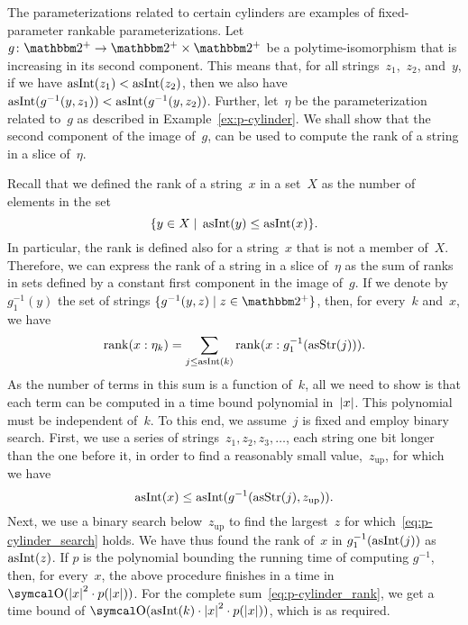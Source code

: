 \begin{example}
\label{ex:fp-rankable}%
  The parameterizations related to certain \pdash{}cylinders are examples of fixed-parameter \pdash{}rankable parameterizations.
  Let $g\colon \binary^+ \to \binary^+ \times \binary^+$ be a polytime-isomorphism that is increasing in its second component.
  This means that, for all strings~$z_1$,~$z_2$, and~$y$, if we have $\operatorname{asInt}(z_1) < \operatorname{asInt}(z_2)$, then we also have $\operatorname{asInt}(g^{-1}(y, z_1)) < \operatorname{asInt}(g^{-1}(y, z_2))$.
  Further, let~$\eta$ be the parameterization related to~$g$ as described in Example~\ref{ex:p-cylinder}.
  We shall show that the second component of the image of~$g$, can be used to compute the rank of a string in a slice of~$\eta$.

  Recall that we defined the rank of a string~$x$ in a set~$X$ as the number of elements in the set
  \begin{equation*}
    \{y \in X \;|\; \operatorname{asInt}(y) \le \operatorname{asInt}(x)\}.
  \end{equation*}
  In particular, the rank is defined also for a string~$x$ that is not a member of~$X$.
  Therefore, we can express the rank of a string in a slice of~$\eta$ as the sum of ranks in sets defined by a constant first component in the image of~$g$.
  If we denote by $g_1^{-1}(y)$ the set of strings $\{g^{-1}(y, z) \st z \in \binary^+\}$, then, for every~$k$ and~$x$, we have
  \begin{equation}
  \label{eq:p-cylinder_rank}
    \operatorname{rank}(x : \eta_k) = \sum_{j \le \operatorname{asInt}(k)} \operatorname{rank}(x : g_1^{-1}(\operatorname{asStr}(j))).
  \end{equation}
  As the number of terms in this sum is a function of~$k$, all we need to show is that each term can be computed in a time bound polynomial in~${\lvert x\rvert}$.
  This polynomial must be independent of~$k$.
  To this end, we assume~$j$ is fixed and employ binary search.
  First, we use a series of strings~$z_1, z_2, z_3, \ldots$, each string one bit longer than the one before it, in order to find a reasonably small value,~$z_\mathrm{up}$, for which we have
  \begin{equation}
  \label{eq:p-cylinder_search}
    \operatorname{asInt}(x) \le \operatorname{asInt}(g^{-1}(\operatorname{asStr}(j), z_\mathrm{up})).
  \end{equation}
  Next, we use a binary search below~$z_\mathrm{up}$ to find the largest~$z$ for which~\eqref{eq:p-cylinder_search} holds.
  We have thus found the rank of~$x$ in $g_1^{-1}(\operatorname{asInt}(j))$ as $\operatorname{asInt}(z)$.
  If $p$ is the polynomial bounding the running time of computing $g^{-1}$, then, for every~$x$, the above procedure finishes in a time in $\bigO(\length{x}^2 \cdot p(\length{x}))$.
  For the complete sum~\eqref{eq:p-cylinder_rank}, we get a time bound of $\bigO(\asNat(k) \cdot \length{x}^2 \cdot p(\length{x}))$, which is as required.
\end{example}

